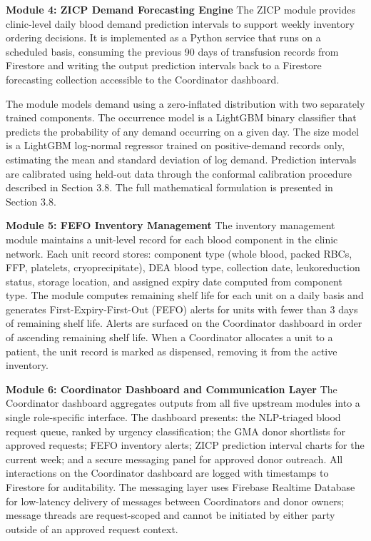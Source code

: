 \documentclass[12pt,a4paper]{article}
\begin{document}
\noindent\textbf{Module 4: ZICP Demand Forecasting Engine}
\noindent The ZICP module provides clinic-level daily blood demand prediction intervals to support weekly inventory ordering decisions. It is implemented as a Python service that runs on a scheduled basis, consuming the previous 90 days of transfusion records from Firestore and writing the output prediction intervals back to a Firestore forecasting collection accessible to the Coordinator dashboard.

\noindent The module models demand using a zero-inflated distribution with two separately trained components. The occurrence model is a LightGBM binary classifier that predicts the probability of any demand occurring on a given day. The size model is a LightGBM log-normal regressor trained on positive-demand records only, estimating the mean and standard deviation of log demand. Prediction intervals are calibrated using held-out data through the conformal calibration procedure described in Section 3.8. The full mathematical formulation is presented in Section 3.8.

\noindent\textbf{Module 5: FEFO Inventory Management}
\noindent The inventory management module maintains a unit-level record for each blood component in the clinic network. Each unit record stores: component type (whole blood, packed RBCs, FFP, platelets, cryoprecipitate), DEA blood type, collection date, leukoreduction status, storage location, and assigned expiry date computed from component type. The module computes remaining shelf life for each unit on a daily basis and generates First-Expiry-First-Out (FEFO) alerts for units with fewer than 3 days of remaining shelf life. Alerts are surfaced on the Coordinator dashboard in order of ascending remaining shelf life. When a Coordinator allocates a unit to a patient, the unit record is marked as dispensed, removing it from the active inventory.

\noindent\textbf{Module 6: Coordinator Dashboard and Communication Layer}
\noindent The Coordinator dashboard aggregates outputs from all five upstream modules into a single role-specific interface. The dashboard presents: the NLP-triaged blood request queue, ranked by urgency classification; the GMA donor shortlists for approved requests; FEFO inventory alerts; ZICP prediction interval charts for the current week; and a secure messaging panel for approved donor outreach. All interactions on the Coordinator dashboard are logged with timestamps to Firestore for auditability. The messaging layer uses Firebase Realtime Database for low-latency delivery of messages between Coordinators and donor owners; message threads are request-scoped and cannot be initiated by either party outside of an approved request context.
\end{document}
